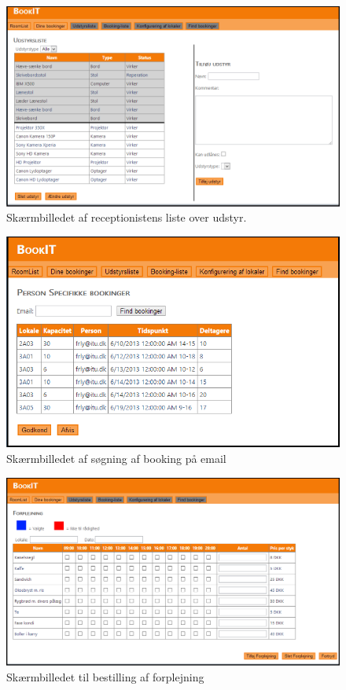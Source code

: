 \begin{figure}[h!]
  \centering
    \includegraphics[angle=90, height=0.9\textheight]{Appendix/GUI-Prototype/DigitalMockup/UdstyrsListe}
  \caption{Skærmbilledet af receptionistens liste over udstyr.}
\label{App_GUI_final_UdstyrsListe}
\end{figure}

\begin{figure}[h!]
  \centering
    \includegraphics[angle=90, height=0.9\textheight]{Appendix/GUI-Prototype/DigitalMockup/SpecifikBookingListe}
  \caption{Skærmbilledet af søgning af booking på email}
\label{App_GUI_final_SpecifikBookingListe}
\end{figure}

\begin{figure}[h!]
  \centering
    \includegraphics[angle=90, height=0.9\textheight]{Appendix/GUI-Prototype/DigitalMockup/Forplejning}
  \caption{Skærmbilledet til bestilling af forplejning}
\label{App_GUI_final_Forplejning}
\end{figure}

